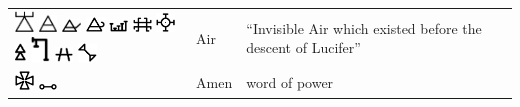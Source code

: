 \documentclass[british,final,landscape]{scrartcl}
\begin{document}
\begin{refsection}
 \tablelasttail{\bottomrule}
 \begin{supertabular}{p{0.3\textwidth}p{0.34\textwidth}p{0.34\textwidth}}
  \includegraphics[width=5mm]{Concepts/Air1} \includegraphics[width=5mm]{Concepts/Air2} \includegraphics[width=5mm]{Concepts/Air3} \includegraphics[width=5mm]{Concepts/Air4} \includegraphics[width=5mm]{Concepts/Air5} \includegraphics[width=5mm]{Concepts/Air6} \includegraphics[width=5mm]{Concepts/Air7} \includegraphics[height=5mm]{Concepts/Air8} \includegraphics[width=5mm]{Concepts/Air9} \includegraphics[width=5mm]{Concepts/Air10} \includegraphics[width=5mm]{Concepts/Air11} & Air & ``Invisible Air which existed before the descent of Lucifer'' \\
  \includegraphics[width=5mm]{Concepts/Amen} \includegraphics[width=5mm]{Concepts/Amen2} & Amen & word of power \\

\end{supertabular}
\end{refsection}
\end{document}

